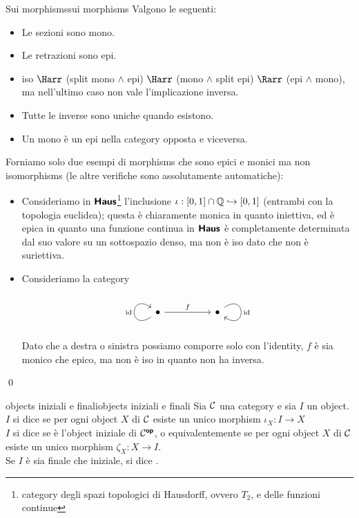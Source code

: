 \documentclass{article}
\renewcommand\C{\mc{C}}
\begin{document}
\begin{remark}{Sui morphisms}{sui morphisms}
    Valgono le seguenti:\begin{itemize}
        \item Le sezioni sono mono.
        \item Le retrazioni sono epi.
        \item iso $\Harr$ (split mono $\wedge$ epi) $\Harr$ (mono $\wedge$ split epi) $\Rarr$ (epi $\wedge$ mono), ma nell'ultimo caso non vale l'implicazione inversa.
        \item Tutte le inverse sono uniche quando esistono.
        \item Un mono è un epi nella category opposta e viceversa.
    \end{itemize}
    \proof 
    Forniamo solo due esempi di morphisms che sono epici e monici ma non isomorphisms (le altre verifiche sono assolutamente automatiche):\begin{itemize}
        \item Consideriamo in $\text{\sffamily\textbf{Haus}}$\footnote{category degli spazi topologici di Hausdorff, ovvero $T_2$, e delle funzioni continue} l'inclusione $\iota: [0,1]\cap \mathbb{Q}\hookrightarrow[0,1]$ (entrambi con la topologia euclidea); questa è chiaramente monica in quanto iniettiva, ed è epica in quanto una funzione continua in $\text{\sffamily\textbf{Haus}}$ è completamente determinata dal suo valore su un sottospazio denso, ma non è iso dato che non è suriettiva.
        \item Consideriamo la category
        \[\begin{tikzcd}
        	\bullet && \bullet
    	    \arrow["\id", from=1-1, to=1-1, loop, in=145, out=215, distance=10mm]
        	\arrow["f", from=1-1, to=1-3]
    	    \arrow["\id", from=1-3, to=1-3, loop, in=325, out=35, distance=10mm]
        \end{tikzcd}\]
        Dato che a destra o sinistra possiamo comporre solo con l'identity, $f$ è sia monico che epico, ma non è iso in quanto non ha inversa.
    \end{itemize}
    \qed
\end{remark}

\begin{definition}{objects iniziali e finali}{objects iniziali e finali}
    Sia $\C$ una category e sia $I$ un object.\\
    $I$ si dice  se per ogni object $X$ di $\C$ esiste un unico morphism $\iota_X:I\to X$\\
    $I$ si dice  se è l'object iniziale di $\C^\op$, o equivalentemente se per ogni object $X$ di $\C$ esiste un unico morphism $\zeta_X : X\to I$.\\
    Se $I$ è sia finale che iniziale, si dice .
\end{definition}
\end{document}
